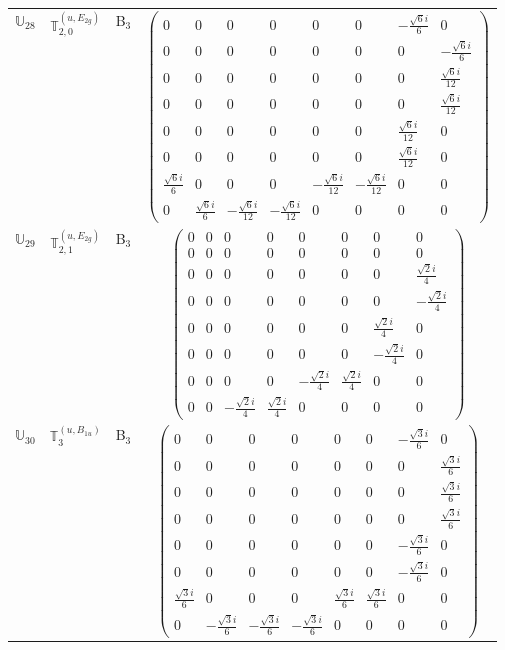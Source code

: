 \documentclass[fleqn,10pt,landscape]{article}
\begin{document}
\begin{itemize}
\begin{center}
\begin{longtable}{c|c|c|c}
$ \mathbb{U}_{28} $ & $\mathbb{T}_{2,0}^{(u,E_{2g})}$ & B$_{3}$ & $\begin{pmatrix} 0 & 0 & 0 & 0 & 0 & 0 & - \frac{\sqrt{6} i}{6} & 0 \\ 0 & 0 & 0 & 0 & 0 & 0 & 0 & - \frac{\sqrt{6} i}{6} \\ 0 & 0 & 0 & 0 & 0 & 0 & 0 & \frac{\sqrt{6} i}{12} \\ 0 & 0 & 0 & 0 & 0 & 0 & 0 & \frac{\sqrt{6} i}{12} \\ 0 & 0 & 0 & 0 & 0 & 0 & \frac{\sqrt{6} i}{12} & 0 \\ 0 & 0 & 0 & 0 & 0 & 0 & \frac{\sqrt{6} i}{12} & 0 \\ \frac{\sqrt{6} i}{6} & 0 & 0 & 0 & - \frac{\sqrt{6} i}{12} & - \frac{\sqrt{6} i}{12} & 0 & 0 \\ 0 & \frac{\sqrt{6} i}{6} & - \frac{\sqrt{6} i}{12} & - \frac{\sqrt{6} i}{12} & 0 & 0 & 0 & 0 \end{pmatrix}$ \\
$ \mathbb{U}_{29} $ & $\mathbb{T}_{2,1}^{(u,E_{2g})}$ & B$_{3}$ & $\begin{pmatrix} 0 & 0 & 0 & 0 & 0 & 0 & 0 & 0 \\ 0 & 0 & 0 & 0 & 0 & 0 & 0 & 0 \\ 0 & 0 & 0 & 0 & 0 & 0 & 0 & \frac{\sqrt{2} i}{4} \\ 0 & 0 & 0 & 0 & 0 & 0 & 0 & - \frac{\sqrt{2} i}{4} \\ 0 & 0 & 0 & 0 & 0 & 0 & \frac{\sqrt{2} i}{4} & 0 \\ 0 & 0 & 0 & 0 & 0 & 0 & - \frac{\sqrt{2} i}{4} & 0 \\ 0 & 0 & 0 & 0 & - \frac{\sqrt{2} i}{4} & \frac{\sqrt{2} i}{4} & 0 & 0 \\ 0 & 0 & - \frac{\sqrt{2} i}{4} & \frac{\sqrt{2} i}{4} & 0 & 0 & 0 & 0 \end{pmatrix}$ \\
$ \mathbb{U}_{30} $ & $\mathbb{T}_{3}^{(u,B_{1u})}$ & B$_{3}$ & $\begin{pmatrix} 0 & 0 & 0 & 0 & 0 & 0 & - \frac{\sqrt{3} i}{6} & 0 \\ 0 & 0 & 0 & 0 & 0 & 0 & 0 & \frac{\sqrt{3} i}{6} \\ 0 & 0 & 0 & 0 & 0 & 0 & 0 & \frac{\sqrt{3} i}{6} \\ 0 & 0 & 0 & 0 & 0 & 0 & 0 & \frac{\sqrt{3} i}{6} \\ 0 & 0 & 0 & 0 & 0 & 0 & - \frac{\sqrt{3} i}{6} & 0 \\ 0 & 0 & 0 & 0 & 0 & 0 & - \frac{\sqrt{3} i}{6} & 0 \\ \frac{\sqrt{3} i}{6} & 0 & 0 & 0 & \frac{\sqrt{3} i}{6} & \frac{\sqrt{3} i}{6} & 0 & 0 \\ 0 & - \frac{\sqrt{3} i}{6} & - \frac{\sqrt{3} i}{6} & - \frac{\sqrt{3} i}{6} & 0 & 0 & 0 & 0 \end{pmatrix}$ \\

\end{longtable}
\end{center}
\end{itemize}
\end{document}
